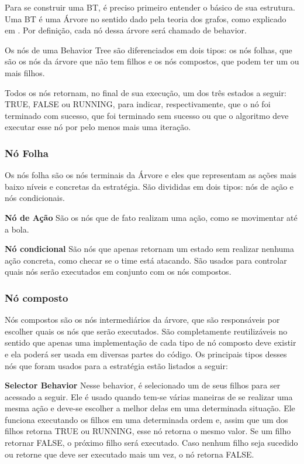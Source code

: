 \documentclass[10pt,fleqn,a4paper]{article}
\begin{document}
Para se construir uma BT, é preciso primeiro entender o básico de sua estrutura. Uma BT é uma Árvore no sentido dado pela teoria dos grafos, como explicado em \cite{west2001introduction}. Por definição, cada nó dessa árvore será chamado de behavior.

Os nós de uma Behavior Tree são diferenciados em dois tipos: os nós folhas, que são os nós da árvore que não tem filhos e os nós compostos, que podem ter um ou mais filhos.

Todos os nós retornam, no final de sua execução, um dos três estados a seguir: TRUE, FALSE ou RUNNING, para indicar, respectivamente, que o nó foi terminado com sucesso, que foi terminado sem sucesso ou que o algoritmo deve executar esse nó por pelo menos mais uma iteração.

\subsubsection{Nó Folha}

Os nós folha são os nós terminais da Árvore e eles que representam as ações mais baixo níveis e concretas da estratégia. São divididas em dois tipos: nós de ação e nós condicionais.

\textbf{Nó de Ação} São os nós que de fato realizam uma ação, como se movimentar até a bola.

\textbf{Nó condicional} São nós que apenas retornam um estado sem realizar nenhuma ação concreta, como checar se o time está atacando. São usados para controlar quais nós serão executados em conjunto com os nós compostos.

\subsubsection{Nó composto}

Nós compostos são os nós intermediários da árvore, que  são responsáveis por escolher quais os nós que serão executados. São completamente reutilizáveis no sentido que apenas uma implementação de cada tipo de nó composto deve existir e ela poderá ser usada em diversas partes do código. Os principais tipos desses nós que foram usados para a estratégia estão listados a seguir:

\textbf{Selector Behavior} Nesse behavior, é selecionado um de seus filhos para ser acessado a seguir. Ele é usado quando tem-se várias maneiras de se realizar uma mesma ação e deve-se escolher a melhor delas em uma determinada situação. Ele funciona executando os filhos em uma determinada ordem e, assim que um dos filhos retorna TRUE ou RUNNING, esse nó retorna o mesmo valor. Se um filho retornar FALSE, o próximo filho será executado. Caso nenhum filho seja sucedido ou retorne que deve ser executado mais um vez, o nó retorna FALSE.
\end{document}
